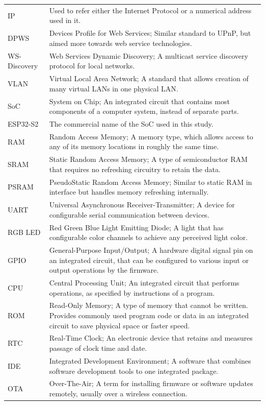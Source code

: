 \begin{longtable}{@{}p{}p{}@{}}
IP & Used to refer either the Internet Protocol or a numerical address used in it. \\
DPWS & Devices Profile for Web Services; Similar standard to UPnP, but aimed more towards web service technologies. \\
WS-Discovery & Web Services Dynamic Discovery; A multicast service discovery protocol for local networks. \\
VLAN & Virtual Local Area Network; A standard that allows creation of many virtual LANs in one physical LAN. \\
SoC & System on Chip; An integrated circuit that contains most components of a computer system, instead of separate parts. \\
ESP32-S2 & The commercial name of the SoC used in this study. \\
RAM & Random Access Memory; A memory type, which allows access to any of its memory locations in roughly the same time. \\
SRAM & Static Random Access Memory; A type of semiconductor RAM that requires no refreshing circuitry to retain the data. \\
PSRAM & PseudoStatic Random Access Memory; Similar to static RAM in interface but handles memory refreshing internally. \\
UART & Universal Asynchronous Receiver-Transmitter; A device for configurable serial communication between devices. \\
RGB LED & Red Green Blue Light Emitting Diode; A light that has configurable color channels to achieve any perceived light color. \\
GPIO & General-Purpose Input/Output; A hardware digital signal pin on an integrated circuit, that can be configured to various input or output operations by the firmware. \\
CPU & Central Processing Unit; An integrated circuit that performs operations, as specified by instructions of a program. \\
ROM & Read-Only Memory; A type of memory that cannot be written. Provides commonly used program code or data in an integrated circuit to save physical space or faster speed. \\
RTC & Real-Time Clock; An electronic device that retains and measures passage of clock time and date. \\
IDE & Integrated Development Environment; A software that combines software development tools to one integrated package. \\
OTA & Over-The-Air; A term for installing firmware or software updates remotely, usually over a wireless connection. \\

\end{longtable}
